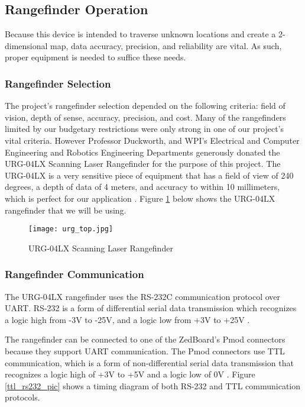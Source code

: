 \subsection{Rangefinder Operation}
Because this device is intended to traverse unknown locations and create a 2-dimensional map, data accuracy, precision, and reliability are vital. As such, proper equipment is needed to suffice these needs. 

\subsubsection{Rangefinder Selection}
The project's rangefinder selection depended on the following criteria: field of vision, depth of sense, accuracy, precision, and cost. Many of the rangefinders limited by our budgetary restrictions were only strong in one of our project's vital criteria. However Professor Duckworth, and WPI's Electrical and Computer Engineering and Robotics Engineering Departments generously donated the URG-04LX Scanning Laser Rangefinder for the purpose of this project. The URG-04LX is a very sensitive piece of equipment that has a field of view of 240 degrees, a depth of data of 4 meters, and accuracy to within 10 millimeters, which is perfect for our application \cite{urg04lx_specifications}. Figure \ref{rangefinder_pic} below shows the URG-04LX rangefinder that we will be using.

\begin{figure}[H]
	\centerline{\texttt{[image: urg\_top.jpg]}}
	\caption{URG-04LX Scanning Laser Rangefinder}
	\label{rangefinder_pic}
\end{figure}

\subsubsection{Rangefinder Communication}
The URG-04LX rangefinder uses the RS-232C communication protocol over UART. RS-232 is a form of differential serial data transmission which recognizes a logic high from -3V to -25V, and a logic low from +3V to +25V \cite{rs232}.
\par
The rangefinder can be connected to one of the ZedBoard's Pmod connectors because they support UART communication. The Pmod connectors use TTL communication, which is a form of non-differential serial data transmission that recognizes a logic high of +3V to +5V and a logic low of 0V \cite{ttl}. Figure \ref{ttl_rs232_pic} shows a timing diagram of both RS-232 and TTL communication protocols.

